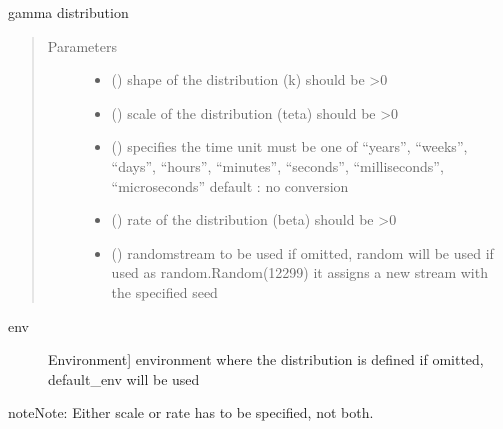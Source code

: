 \documentclass[letterpaper,10pt,english]{sphinxmanual}
\begin{document}
\begin{fulllineitems}
\label{\detokenize{Reference:salabim.Gamma}}
gamma distribution
\begin{quote}\begin{description}
\item[{Parameters}] \leavevmode\begin{itemize}
\item {} 
 () \textendash{} shape of the distribution (k) 
should be \textgreater{}0

\item {} 
 () \textendash{} scale of the distribution (teta) 
should be \textgreater{}0

\item {} 
 () \textendash{} specifies the time unit 
must be one of “years”, “weeks”, “days”, “hours”, “minutes”, “seconds”, “milliseconds”, “microseconds” 
default : no conversion 

\item {} 
 () \textendash{} rate of the distribution (beta) 
should be \textgreater{}0

\item {} 
 () \textendash{} randomstream to be used 
if omitted, random will be used 
if used as random.Random(12299)
it assigns a new stream with the specified seed

\end{itemize}

\end{description}\end{quote}
\begin{description}
\item[{env}] \leavevmode{[}Environment{]}
environment where the distribution is defined 
if omitted, default\_env will be used

\end{description}

\begin{sphinxadmonition}{note}{Note:}
Either scale or rate has to be specified, not both.
\end{sphinxadmonition}


\end{fulllineitems}
\end{document}

